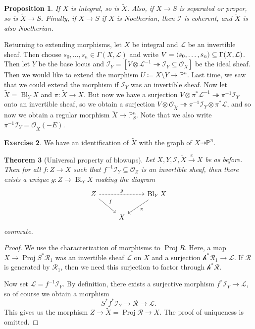\documentclass[leqno, openany]{memoir}
\newtheorem{thm}{Theorem}[section]
\newtheorem{prop}[thm]{Proposition}
\theoremstyle{definition}
\newtheorem{exer}[thm]{Exercise}
\theoremstyle{remark}
\theoremstyle{plain}
\theoremstyle{definition}
\theoremstyle{remark}
\renewcommand{\P}{\mathbb{P}}
\newcommand{\mc}[1]{\mathcal{#1}}
\newcommand{\wt}[1]{\widetilde{#1}}
\DeclareMathOperator{\Proj}{Proj}
\DeclareMathOperator{\Bl}{Bl}
\begin{document}
\begin{prop}
    If $X$ is integral, so is $\wt{X}$. Also, if $X \to S$ is separated or proper, so is $\wt{X} \to S$. Finally, if $X \to S$ if $X$ is Noetherian, then $\mc{I}$ is coherent, and $\wt{X}$ is also Noetherian.
\end{prop}

Returning to extending morphisms, let $X$ be integral and $\mc{L}$ be an invertible sheaf. Then choose $s_0, \ldots, s_n \in \Gamma(X, \mc{L})$ and write $V = \ev{s_0, \ldots, s_n} \subseteq \Gamma(X, \mc{L})$. Then let $Y$ be the base locus and $\mc{I}_Y = [V \otimes \mc{L}^{-1} \twoheadrightarrow \mc{I}_Y \subseteq \mc{O}_X]$ be the ideal sheaf. Then we would like to extend the morphism $U \coloneqq X \setminus Y \to \P^n$. Last time, we saw that we could extend the morphism if $\mc{I}_Y$ was an invertible sheaf. Now let $\wt{X} = \Bl_Y X$ and $\pi \colon \wt{X} \to X$. But now we have a surjection $V \otimes \pi^* \mc{L}^{-1} \twoheadrightarrow \pi^{-1} \mc{I}_Y$ onto an invertible sheaf, so we obtain a surjection $V \otimes \mc{O}_{\wt{X}} \twoheadrightarrow \pi^{-1} \mc{I}_Y \otimes \pi^* \mc{L}$, and so now we obtain a regular morphism $\wt{X} \to \P^n_S$. Note that we also write $\pi^{-1} \mc{I}_Y = \mc{O}_{\wt{X}}(-E)$.

\begin{exer}
    We have an identification of $\wt{X}$ with the graph of $X \dashrightarrow \P^n$.
\end{exer}

\begin{thm}[Universal property of blowups]
    Let $X, Y, \mc{I}, \wt{X} \xrightarrow{\pi} X$ be as before. Then for all $f \colon Z \to X$ such that $f^{-1} \mc{I}_Y \subseteq \mc{O}_Z$ is an invertible sheaf, then there exists a unique $g \colon Z \to \Bl_Y X$ making the diagram
    \begin{equation*}
    \begin{tikzcd}
        Z \ar[dashrightarrow]{rr}{g} \ar{dr}{f} & & \Bl_Y X \ar{dl}{\pi} \\
                                                & X
    \end{tikzcd}
    \end{equation*}
    commute.
\end{thm}

\begin{proof}
    We use the characterization of morphisms to $\Proj R$. Here, a map $X \to \Proj S^* \mc{R}_1$ was an invertible sheaf $\mc{L}$ on $X$ and a surjection $\mc{h}^* \mc{R}_1 \to \mc{L}$. If $\mc{R}$ is generated by $\mc{R}_1$, then we need this surjection to factor through $\mc{h}^* \mc{R}$. 

    Now set $\mc{L} = f^{-1} \mc{I}_Y$. By definition, there exists a surjective morphism $f^* \mc{I}_Y \to \mc{L}$, so of course we obtain a morphism
    \[ S^* f^* \mc{I}_Y \to \mc{R} \to \mc{L}. \]
    This gives us the morphism $Z \to \wt{X} = \Proj \mc{R} \to X$. The proof of uniqueness is omitted.
\end{proof}
\end{document}
